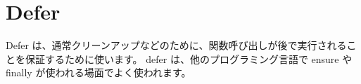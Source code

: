\section{Defer}

Defer は、通常クリーンアップなどのために、関数呼び出しが後で実行されることを保証するために使います。 defer は、他のプログラミング言語で ensure や finally が使われる場面でよく使われます。




